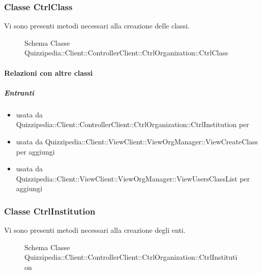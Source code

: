 \subsubsection{Classe CtrlClass}
Vi sono presenti metodi necessari alla creazione delle classi.
\begin{figure}[H]
\centering
\noindent{}
\caption[Schema Classe CtrlClass]{Schema Classe Quizzipedia::Client::ControllerClient::CtrlOrganization::CtrlClass}
\end{figure}
\paragraph{Relazioni con altre classi}
\subparagraph{Entranti}
\begin{itemize}
\item usata da Quizzipedia::Client::ControllerClient::CtrlOrganization::CtrlInstitution per 
\item usata da Quizzipedia::Client::ViewClient::ViewOrgManager::ViewCreateClass per aggiungi
\item usata da Quizzipedia::Client::ViewClient::ViewOrgManager::ViewUsersClassList per aggiungi
\end{itemize}
\subsubsection{Classe CtrlInstitution}
Vi sono presenti metodi necessari alla creazione degli enti.
\begin{figure}[H]
\centering
\noindent{}
\caption[Schema Classe CtrlInstitution]{Schema Classe Quizzipedia::Client::ControllerClient::CtrlOrganization::CtrlInstitution}
\end{figure}
